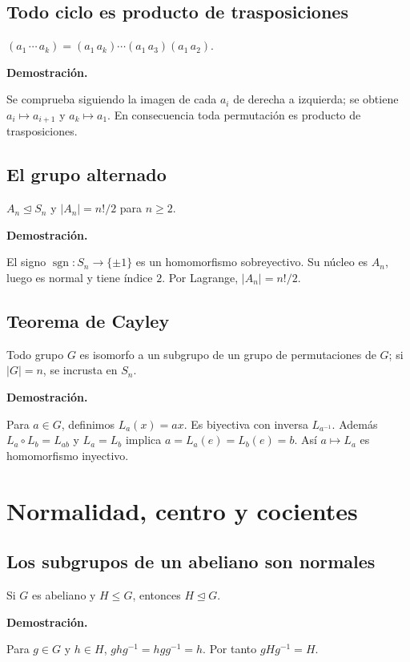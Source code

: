 \documentclass[11pt,a4paper]{article}
\begin{document}
\subsection{Todo ciclo es producto de trasposiciones}
\begin{resultado}
$(a_1\,\cdots\,a_k)=(a_1\,a_k)\cdots(a_1\,a_3)(a_1\,a_2)$.
\end{resultado}
\textbf{Demostración.}
\begin{demostracion}
Se comprueba siguiendo la imagen de cada $a_i$ de derecha a izquierda; se obtiene $a_i\mapsto a_{i+1}$ y $a_k\mapsto a_1$. En consecuencia toda permutación es producto de trasposiciones.
\end{demostracion}


\subsection{El grupo alternado}
\begin{resultado}
$A_n\trianglelefteq S_n$ y $|A_n|=n!/2$ para $n\ge2$.
\end{resultado}
\textbf{Demostración.}
\begin{demostracion}
El signo $\operatorname{sgn}:S_n\to\{\pm1\}$ es un homomorfismo sobreyectivo. Su núcleo es $A_n$, luego es normal y tiene índice $2$. Por Lagrange, $|A_n|=n!/2$.
\end{demostracion}


\subsection{Teorema de Cayley}
\begin{resultado}
Todo grupo $G$ es isomorfo a un subgrupo de un grupo de permutaciones de $G$; si $|G|=n$, se incrusta en $S_n$.
\end{resultado}
\textbf{Demostración.}
\begin{demostracion}
Para $a\in G$, definimos $L_a(x)=ax$. Es biyectiva con inversa $L_{a^{-1}}$. Además $L_a\circ L_b=L_{ab}$ y $L_a=L_b$ implica $a=L_a(e)=L_b(e)=b$. Así $a\mapsto L_a$ es homomorfismo inyectivo.
\end{demostracion}


\section{Normalidad, centro y cocientes}

\subsection{Los subgrupos de un abeliano son normales}
\begin{resultado}
Si $G$ es abeliano y $H\le G$, entonces $H\trianglelefteq G$.
\end{resultado}
\textbf{Demostración.}
\begin{demostracion}
Para $g\in G$ y $h\in H$, $ghg^{-1}=hgg^{-1}=h$. Por tanto $gHg^{-1}=H$.
\end{demostracion}
\end{document}

